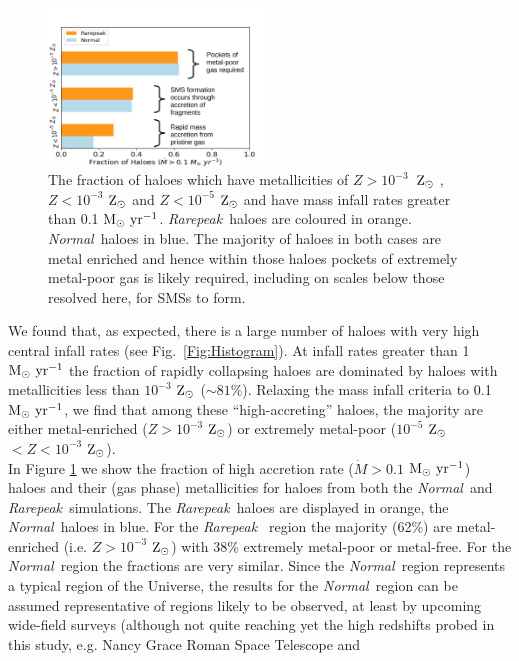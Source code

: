\documentclass[twocolumn,iop,revtex4]{openjournal}
\newcommand{\msolaryr} {$\rm{M_{\odot}~yr^{-1}}~$}
\newcommand{\msolaryrc} {$\rm{M_{\odot}~yr^{-1}}$}
\newcommand{\zsolar} {$\rm{Z_{\odot}}~$}
\newcommand{\zsolarc} {$\rm{Z_{\odot}}$}
\newcommand{\rarepeak} {\textit{Rarepeak~}}
\newcommand{\normal} {\textit{Normal~}}
\begin{document}
\begin{figure}
   \centering 
\includegraphics[width=0.525\textwidth]{FIGURES/FinalPlot-crop.pdf}
\caption{The fraction of haloes which have metallicities of $Z > 10^{-3}$~\zsolar,
  $Z < 10^{-3}$ \zsolar and $ Z < 10^{-5}$ \zsolar and have mass infall rates greater than
  0.1 \msolaryrc. \rarepeak haloes are coloured in orange. \normal haloes in blue. 
  The majority of haloes in both cases are metal enriched and hence within
  those haloes pockets of extremely metal-poor gas 
  is likely required, including on scales below those resolved here, for SMSs to form. } \label{Fig:Fractions}
\end{figure}
\indent We found that, as expected, there is a large number of haloes with
very high central infall rates (see Fig.~\ref{Fig:Histogram}). At infall rates
greater than 1 \msolaryr the fraction of rapidly collapsing haloes are dominated by haloes with
metallicities less than $10^{-3}$ \zsolar ($\sim 81$\%).
Relaxing the
mass infall criteria to 0.1 \msolaryrc,
we find that among these ``high-accreting''
haloes, the majority are either metal-enriched ($Z > 10^{-3}$ \zsolarc) or
extremely metal-poor ($10^{-5}$ \zsolar $ < Z < 10^{-3}$ \zsolarc). \\
\indent In Figure \ref{Fig:Fractions}
we show the fraction of high accretion rate ($\dot{M} > 0.1$ \msolaryrc) haloes and
their (gas phase) metallicities for haloes from both the \normal and \rarepeak simulations.
The \rarepeak haloes are displayed in orange, the \normal haloes in blue. For the \rarepeak
region the majority (62\%) are metal-enriched (i.e. $Z > 10^{-3}$ \zsolarc) with 38\% extremely
metal-poor or metal-free. For the \normal region the fractions are very similar.
Since the \normal region represents a typical
region of the Universe, the results for the \normal region can be assumed representative of 
regions likely to be observed, at least by upcoming wide-field surveys (although not quite
reaching yet the high redshifts probed in this study, e.g. Nancy Grace Roman Space Telescope and
\end{document}
